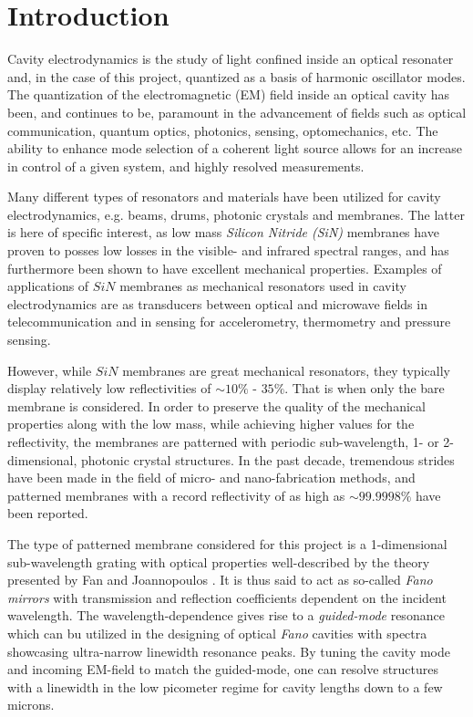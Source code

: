 \newpage
\section{Introduction}

Cavity electrodynamics is the study of light confined inside an optical resonater and, in the case of this project, quantized as a basis of harmonic oscillator modes. The quantization of the electromagnetic (EM) field inside an optical cavity has been, and continues to be, paramount in the advancement of fields such as optical communication, quantum optics, photonics, sensing, optomechanics, etc. The ability to enhance mode selection of a coherent light source allows for an increase in control of a given system, and highly resolved measurements. 

Many different types of resonators and materials have been utilized for cavity electrodynamics, e.g. beams, drums, photonic crystals and membranes. The latter is here of specific interest, as low mass \emph{Silicon Nitride (SiN)} membranes have proven to posses low losses in the visible- and infrared spectral ranges, and has furthermore been shown to have excellent mechanical properties. Examples of applications of $SiN$ membranes as mechanical resonators used in cavity electrodynamics are as transducers between optical and microwave fields in telecommunication and in sensing for accelerometry, thermometry and pressure sensing. 

However, while $SiN$ membranes are great mechanical resonators, they typically display relatively low reflectivities of $\sim 10\%$ - $35\%$. That is when only the bare membrane is considered. In order to preserve the quality of the mechanical properties along with the low mass, while achieving higher values for the reflectivity, the membranes are patterned with periodic sub-wavelength, 1- or 2-dimensional, photonic crystal structures. In the past decade, tremendous strides have been made in the field of micro- and nano-fabrication methods, and patterned membranes with a record reflectivity of as high as $\sim 99.9998\%$ have been reported.

The type of patterned membrane considered for this project is a 1-dimensional sub-wavelength grating with optical properties well-described by the theory presented by Fan and Joannopoulos \cite{Fan-Joannopoulos-guided-mode-resonance} \cite{Fan-Joannopoulos-fano-resonance}. It is thus said to act as so-called \emph{Fano mirrors} with transmission and reflection coefficients dependent on the incident wavelength. The wavelength-dependence gives rise to a \emph{guided-mode} resonance which can bu utilized in the designing of optical \emph{Fano} cavities with spectra showcasing ultra-narrow linewidth resonance peaks. By tuning the cavity mode and incoming EM-field to match the guided-mode, one can resolve structures with a linewidth in the low picometer regime for cavity lengths down to a few microns. 

